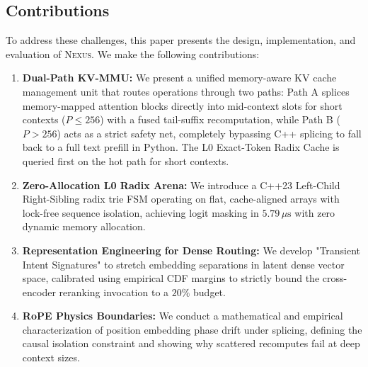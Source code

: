 \subsection{Contributions}
To address these challenges, this paper presents the design, implementation, and evaluation of \textsc{Nexus}. We make the following contributions:
\begin{enumerate}
  \item \textbf{Dual-Path KV-MMU:} We present a unified memory-aware KV cache management unit that routes operations through two paths: Path A splices memory-mapped attention blocks directly into mid-context slots for short contexts ($P \le 256$) with a fused tail-suffix recomputation, while Path B ($P > 256$) acts as a strict safety net, completely bypassing C++ splicing to fall back to a full text prefill in Python. The L0 Exact-Token Radix Cache is queried first on the hot path for short contexts.
  \item \textbf{Zero-Allocation L0 Radix Arena:} We introduce a C++23 Left-Child Right-Sibling radix trie FSM operating on flat, cache-aligned arrays with lock-free sequence isolation, achieving logit masking in $5.79\,\mu\text{s}$ with zero dynamic memory allocation.
  \item \textbf{Representation Engineering for Dense Routing:} We develop "Transient Intent Signatures" to stretch embedding separations in latent dense vector space, calibrated using empirical CDF margins to strictly bound the cross-encoder reranking invocation to a $20\%$ budget.
  \item \textbf{RoPE Physics Boundaries:} We conduct a mathematical and empirical characterization of position embedding phase drift under splicing, defining the causal isolation constraint and showing why scattered recomputes fail at deep context sizes.
\end{enumerate}
